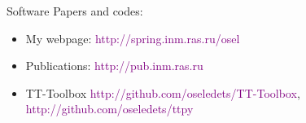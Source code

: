 \documentclass{beamer}[14pt, presentation]
\begin{document}
\begin{frame}[label=sec-10-3]{Software}
 Papers and codes: 
\begin{large}
\begin{itemize} 
\item My webpage: \textcolor{purple}{http://spring.inm.ras.ru/osel}
\item Publications: \textcolor{purple}{http://pub.inm.ras.ru}
\item TT-Toolbox
\textcolor{purple}{http://github.com/oseledets/TT-Toolbox},  \textcolor{purple}{http://github.com/oseledets/ttpy}
\end{itemize}
\end{large}
\end{frame}
\end{document}
